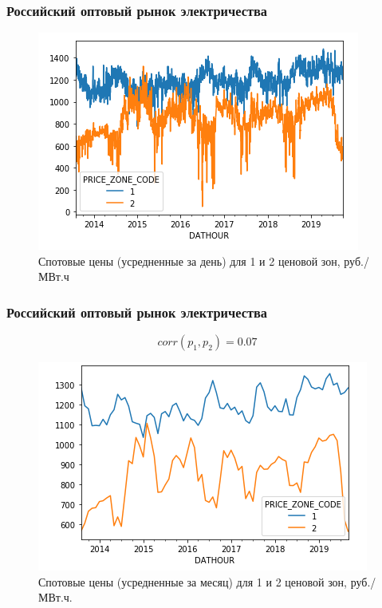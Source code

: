 \documentclass[c, dvipsnames]{beamer}  %
\begin{document}
\begin{frame}[shrink=5]
\frametitle{Российский оптовый рынок электричества} 

\begin{figure}
	\centering
	\includegraphics[width=0.7\linewidth]{screenshot009}
	\caption{Спотовые цены (усредненные за день) для 1 и 2 ценовой зон, руб./МВт.ч}
	\label{fig:screenshot009}
\end{figure}


\end{frame}




\begin{frame}[shrink=5]
\frametitle{Российский оптовый рынок электричества} 

\begin{equation}\label{key}
corr(p_1,p_2)  =  0.07
\end{equation}

\begin{figure}
	\centering
	\includegraphics[width=0.7\linewidth]{screenshot010}
	\caption{Спотовые цены (усредненные за месяц) для 1 и 2 ценовой зон, руб./МВт.ч.}
	\label{fig:screenshot009}
\end{figure}




\end{frame}
\end{document}
